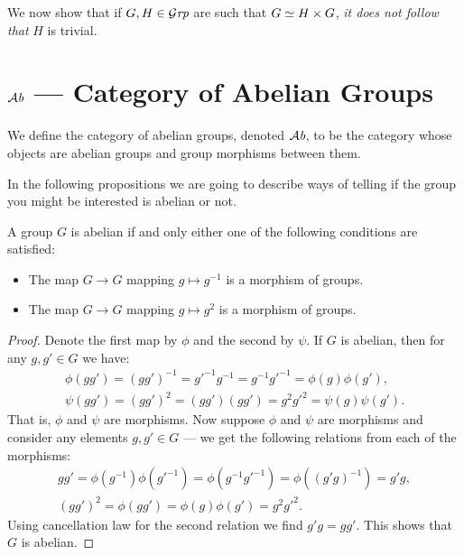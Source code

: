 \begin{remark}
  We now show that if \(G, H \in {\mathcal{G}\textit{rp}}\) are such that \(G \simeq H \times G\),
  \emph{it does not follow that} \(H\) is trivial.
\end{remark}


\section{\texorpdfstring{\({\mathcal{A}\textit{b}}\)}{Ab} --- Category of Abelian Groups}

\begin{definition}
  We define the category of abelian groups, denoted \({\mathcal{A}\textit{b}}\), to be the category
  whose objects are abelian groups and group morphisms between them.
\end{definition}

In the following propositions we are going to describe ways of telling if the
group you might be interested is abelian or not.

\begin{proposition}
  A group \(G\) is abelian if and only either one of the following conditions
  are satisfied:
  \begin{itemize}
    \setlength\itemsep{0em}
    \item The map \(G \to G\) mapping \(g \mapsto g^{-1}\) is a morphism of
      groups.
    \item The map \(G \to G\) mapping \(g \mapsto g^2\) is a morphism of groups.
  \end{itemize}
\end{proposition}

\begin{proof}
  Denote the first map by \(\phi\) and the second by \(\psi\). If \(G\) is
  abelian, then for any \(g, g' \in G\) we have:
  \begin{gather*}
    \phi(gg') = (gg')^{-1} = g'^{-1} g^{-1} = g^{-1}g'^{-1} = \phi(g) \phi(g'),
    \\
    \psi(gg') = (gg')^2 = (gg')(gg') = g^2g'^2 = \psi(g)\psi(g').
  \end{gather*}
  That is, \(\phi\) and \(\psi\) are morphisms. Now suppose \(\phi\) and
  \(\psi\) are morphisms and consider any elements \(g, g' \in G\) --- we get
  the following relations from each of the morphisms:
  \begin{gather*}
    gg' = \phi(g^{-1})\phi(g'^{-1}) = \phi(g^{-1}g'^{-1})
    = \phi((g'g)^{-1}) = g'g,
    \\
    (gg')^2 = \phi(gg') = \phi(g) \phi(g') = g^2 g'^2.
  \end{gather*}
  Using cancellation law for the second relation we find \(g'g = gg'\). This
  shows that \(G\) is abelian.
\end{proof}


